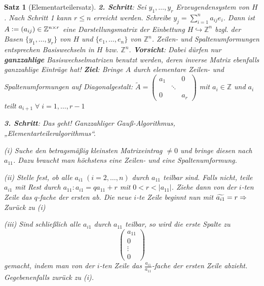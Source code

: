 \documentclass[a4paper,10pt,german]{scrbook}
\theoremstyle{saetze}
\newtheorem{Satz}{Satz}
\theoremstyle{definitionen}
\begin{document}
\begin{Satz}[Elementarteilersatz]
{        \noindent\textbf{2. Schritt}:
            Sei $y_1, \dots, y_r$ Erzeugendensystem von $H$. Nach Schritt 1 kann
            $r \leq n$ erreicht werden. Schreibe $y_j = \displaystyle \sum_{i=1}^n a_{ij}
            e_i$. Dann ist $A\mathrel{\mathop:}=(a_{ij}) \in \mathbb{Z}^{n \times r}$ eine 
            Darstellungsmatrix der Einbettung $H \hookrightarrow \mathbb{Z}^n$ 
            bzgl. der Basen $\{y_1, \dots, y_r\}$ von $H$ und 
            $\{e_1,\dots,e_n\}$ von $\mathbb{Z}^n$. Zeilen- und
            Spaltenumformungen entsprechen Basiswechseln in $H$ bzw. $\mathbb{Z}^n$.
            \newline
            \textbf{Vorsicht}:
                Dabei dürfen nur \textbf{ganzzahlige} Basiswechselmatrizen 
                benutzt werden, deren inverse Matrix ebenfalls ganzzahlige Einträge hat!
            \newline \textbf{Ziel}: Bringe $A$ durch elementare Zeilen- und 
            Spaltenumformungen auf Diagonalgestalt: \newline $\widetilde{A} = 
            \begin{pmatrix} a_1 & & 0 \\ &  \ddots \\ 0  & & a_r \end{pmatrix}$
            mit $a_i \in \mathbb{Z}$ und $a_i$ teilt $a_{i+1}\; \forall\;
            i=1,\dots,r-1$

    \noindent\textbf{3. Schritt}:
            Das geht! Ganzzahliger Gauß-Algorithmus, „Elementarteileralgorithmus“.
            \begin{enum}
                \item[(i)] Suche den betragsmäßig kleinsten Matrixeintrag $\neq
                0$ und bringe diesen nach $a_{11}$. Dazu braucht man höchstens
                eine Zeilen- und eine Spaltenumformung.
                
                \item[(ii)] Stelle fest, ob alle $a_{i1}\; (i=2,\dots,n)$ durch
                $a_{11}$ teilbar sind. Falls nicht, teile $a_{i1}$ mit Rest durch
                $a_{11} : a_{i1} = q a_{11} + r$ mit $0 < r < |a_{11}|$. Ziehe
                dann von der $i$-ten Zeile das $q$-fache der ersten ab. Die
                neue $i$-te Zeile beginnt nun mit $\widetilde{a_{i1}} = r \Rightarrow$
                Zurück zu (i)
                
                \item[(iii)] Sind schließlich alle $a_{i1}$ durch $a_{11}$
                teilbar, so wird die erste Spalte zu \[ \left( \begin{array}{c}
                a_{11} \\ 0 \\ \vdots \\ 0 \end{array} \right) \] gemacht,
                indem man von der $i$-ten Zeile das $\frac{a_{i1}}{a_{11}}$-fache
                der ersten Zeile abzieht. Gegebenenfalls zurück zu (i).


\end{enum}}
\end{Satz}
\end{document}
